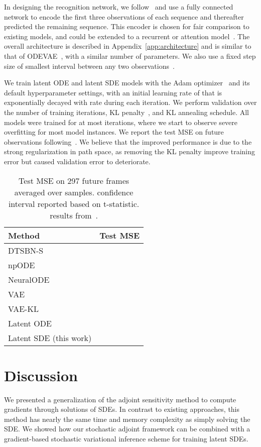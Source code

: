 \documentclass[twoside]{article}
\begin{document}
In designing the recognition network, we follow~\citet{yildiz2019ode} and use a fully connected network to encode the first three observations of each sequence and thereafter predicted the remaining sequence.
This encoder is chosen for fair comparison to existing models, and could be extended to a recurrent or attention model~\cite{vaswani2017attention}.
The overall architecture is described in Appendix~\ref{app:architecture} and is similar to that of ODEVAE~\cite{yildiz2019ode}, with a similar number of parameters. 
We also use a fixed step size  of smallest interval between any two observations~\cite{yildiz2019ode}.

We train latent ODE and latent SDE models with the Adam optimizer~\cite{kingma2014adam} and its default hyperparameter settings, with an initial learning rate of  that is exponentially decayed with rate  during each iteration. 
We perform validation over the number of training iterations, KL penalty~\cite{higgins2017beta}, and KL annealing schedule. 
All models were trained for at most  iterations, where we start to observe severe overfitting for most model instances. 
We report the test MSE on future observations following~\citet{yildiz2019ode}. 
We believe that the improved performance is due to the strong regularization in path space, as removing the KL penalty improve training error but caused validation error to deteriorate. 

\begin{table}[h]
\caption{Test MSE on 297 future frames averaged over  samples.  confidence interval reported based on t-statistic. results from~\cite{yildiz2019ode}.
}
\label{tab:mocap_results}
\centering
 \begin{tabular}{l l} 
 \midrule
 Method
 & Test MSE \\
 \midrule
 DTSBN-S~\cite{gan2015deep} &   \\
 {np}ODE~\cite{heinonen2018learning} &  \\
 {Neural}ODE~\cite{chen2018neural} &   \\
 VAE~\cite{yildiz2019ode} &  \\
 VAE-KL~\cite{yildiz2019ode} & \\
 Latent ODE~\cite{chen2018neural,rubanova2019latent} &  \\
 Latent SDE (this work) &  \\
 \midrule
 \end{tabular}
\end{table}
 



\section{Discussion}
We presented a generalization of the adjoint sensitivity method to compute gradients through solutions of SDEs. 
In contrast to existing approaches, this method has nearly the same time and memory complexity as simply solving the SDE.
We showed how our stochastic adjoint framework can be combined with a gradient-based stochastic variational inference scheme for training latent SDEs.
\end{document}
